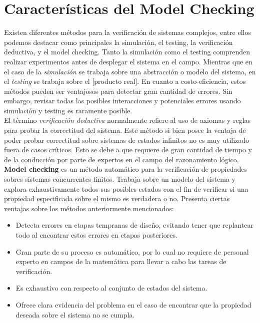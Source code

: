 \documentclass[titlepage, 12pt]{book}
\begin{document}




\section{Caracter\'isticas del Model Checking}
Existen diferentes m\'etodos para la verificaci\'on de sistemas complejos, entre ellos podemos destacar como principales la simulaci\'on, el testing, la verificaci\'on deductiva, y el model checking\cite{Clarke}. Tanto la simulaci\'on como el testing comprenden realizar experimentos antes de desplegar el sistema en el campo. Mientras que en el caso de la \textit{simulaci\'on} se trabaja sobre una abstracci\'on o modelo del sistema, en el \textit{testing} se trabaja sobre el [producto real]. En cuanto a costo-eficiencia, estos m\'etodos pueden ser ventajosos para detectar gran cantidad de errores. Sin embargo, revisar todas las posibles interacciones y potenciales errores usando simulaci\'on y testing es raramente posible.\\
El t\'ermino \textit{verificaci\'on deductiva} normalmente refiere al uso de axiomas y reglas para probar la correctitud del sistema. Este m\'etodo si bien posee la ventaja de poder probar correctitud sobre sistemas de estados infinitos no es muy utilizado fuera de casos cr\'iticos. Esto se debe a que requiere de gran cantidad de tiempo y de la conducci\'on por parte de expertos en el campo del razonamiento l\'ogico.\\

\textbf{Model checking} es un m\'etodo autom\'atico para la verificaci\'on de propiedades sobres sistemas concurrentes finitos. Trabaja sobre un modelo del sistema y explora exhaustivamente todos sus posibles estados con el fin de verificar si una propiedad especificada sobre el mismo es verdadera o no. Presenta ciertas ventajas sobre los m\'etodos anteriormente mencionados:

\begin{itemize}
\item Detecta errores en etapas tempranas de diseño, evitando tener que replantear todo al encontrar estos errores en etapas posteriores.

\item Gran parte de su proceso es autom\'atico, por lo cual no requiere de personal experto en campos de la matem\'atica para llevar a cabo las tareas de verificaci\'on.

\item Es exhaustivo con respecto al conjunto de estados del sistema.

\item Ofrece clara evidencia del problema en el caso de encontrar que la propiedad deseada sobre el sistema no se cumpla.
\end{itemize}
\end{document}
